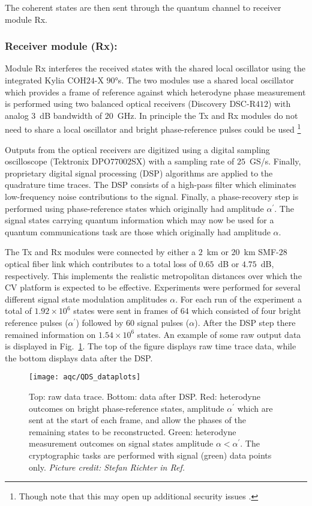 The coherent states are then sent through the quantum channel to receiver module Rx.

\subsubsection{Receiver module (Rx):}
Module Rx interferes the received states with the shared local oscillator using the integrated Kylia COH$24$-X $90\si{\degree}$s. The two modules use a shared local oscillator which provides a frame of reference against which heterodyne phase measurement is performed using two balanced optical receivers (Discovery DSC-R$412$) with analog $3$~dB bandwidth of $20$~GHz. In principle the Tx and Rx modules do not need to share a local oscillator and bright phase-reference pulses could be used \cite{Huang2015}\footnote{Though note that this may open up additional security issues \cite{Ren2019}.}

Outputs from the optical receivers are digitized using a digital sampling oscilloscope (Tektronix DPO$77002$SX) with a sampling rate of $25$~GS/s. Finally, proprietary digital signal processing (DSP) algorithms are applied to the quadrature time traces. The DSP consists of a high-pass filter which eliminates low-frequency noise contributions to the signal. Finally, a phase-recovery step is performed using phase-reference states which originally had amplitude $\alpha^\prime$. The signal states carrying quantum information which may now be used for a quantum communications task are those which originally had amplitude $\alpha$.

The Tx and Rx modules were connected by either a $2$~km or $20$~km SMF-$28$ optical fiber link which contributes to a total loss of $0.65$~dB or $4.75$~dB, respectively. This implements the realistic metropolitan distances over which the CV platform is expected to be effective. Experiments were performed for several different signal state modulation amplitudes $\alpha$. For each run of the experiment a total of $1.92\times 10^6$ states were sent in frames of $64$ which consisted of four bright reference pulses ($\alpha^\prime$) followed by $60$ signal pulses ($\alpha$). After the DSP step there remained information on $1.54 \times 10^6$ states. An example of some raw output data is displayed in Fig.~\ref{fig:aqc_experimental_trace}. The top of the figure displays raw time trace data, while the bottom displays data after the DSP.


\begin{figure}[htp]
\centering
\texttt{[image: aqc/QDS\_dataplots]}
\caption{\label{fig:aqc_experimental_trace} Top: raw data trace. Bottom: data after DSP. Red: heterodyne outcomes on bright phase-reference states, amplitude $\alpha^\prime$ which are sent at the start of each frame, and allow the phases of the remaining states to be reconstructed. Green: heterodyne measurement outcomes on signal states amplitude $\alpha < \alpha^\prime$. The cryptographic tasks are performed with signal (green) data points only. \emph{Picture credit: Stefan Richter in Ref.~\cite{Richter2020}}}
\end{figure}

